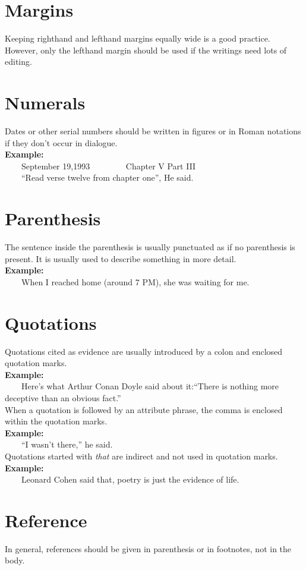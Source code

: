 \documentclass[12pt]{report}
\newcommand{\xmpl}{\textbf{Example:}\\} %
\newcommand{\indnt}{\ \ \ \ } %
\begin{document}
\section{Margins}
Keeping righthand and lefthand margins equally wide is a good practice. However, only the lefthand margin should be used if the writings need lots of editing.


\section{Numerals}
Dates or other serial numbers should be written in figures or in Roman notations if they don't occur in dialogue.\\
\xmpl
\indnt September 19,1993 \indnt \indnt Chapter V Part III\\
\indnt ``Read verse twelve from chapter one'', He said.


\section{Parenthesis}
The sentence inside the parenthesis is usually punctuated as if no parenthesis is present. It is usually used to describe something in more detail.\\
\xmpl
\indnt When I reached home (around 7 PM), she was waiting for me.


\section{Quotations}
Quotations cited as evidence are usually introduced by a colon and enclosed quotation marks.\\
\newpage
\xmpl 
\indnt Here's what Arthur Conan Doyle said about it:``There is nothing more deceptive than an obvious fact.''\\
When a quotation is followed by an attribute phrase, the comma is enclosed within the quotation marks.\\
\xmpl
\indnt ``I wasn't there,'' he said.\\
Quotations started with \textit{that} are indirect and not used in quotation marks.\\
\xmpl
\indnt Leonard Cohen said that, poetry is just the evidence of life.\\


\section{Reference}
In general, references should be given in parenthesis or in footnotes, not in the body.
\end{document}

